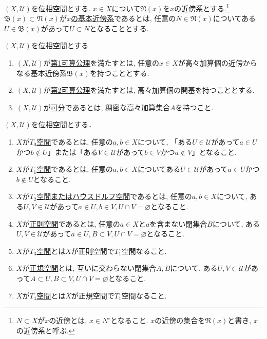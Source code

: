 \documentclass[dvipdfmx,a4paper,11pt]{article}
\theoremstyle{definition}
\begin{document}
 $(X, \mathscr{U})$を位相空間とする. $x\in X$について$\mathfrak{N}(x) $を$x$の近傍系とする.\footnote{$N \subset X$が$x$の近傍とは, $x \in N^{\circ}$となること. $x$の近傍の集合を$\mathfrak{N}(x) $と書き, $x$の近傍系と呼ぶ.} 
$\mathfrak{B}(x) \subset \mathfrak{N}(x) $が\underline{$x$の基本近傍系}であるとは, 任意の$N \in \mathfrak{N}(x)$についてある$U \in \mathfrak{B}(x)$があって$U \subset N$となることとする.
    \begin{tcolorbox}[
    colback = white,
    colframe = green!35!black,
    fonttitle = \bfseries,
    breakable = true]
$(X, \mathscr{U})$を位相空間とする
\begin{enumerate}
\setlength{\parskip}{0cm} 
  \setlength{\itemsep}{4pt} 
\item $(X, \mathscr{U})$が\underline{第1可算公理}を満たすとは, 任意の$x \in X$が高々加算個の近傍からなる基本近傍系$\mathfrak{B}(x)$を持つこととする.
\item $(X, \mathscr{U})$が\underline{第2可算公理}を満たすとは, 高々加算個の開基を持つこととする.
\item $(X, \mathscr{U})$が\underline{可分}であるとは, 稠密な高々加算集合$A$を持つこと.
\end{enumerate}
 \end{tcolorbox}

   \begin{tcolorbox}[
    colback = white,
    colframe = green!35!black,
    fonttitle = \bfseries,
    breakable = true]
$(X, \mathscr{U})$を位相空間とする．

\begin{enumerate}
\setlength{\parskip}{0cm} 
  \setlength{\itemsep}{4pt} 
  \item  $X$が\underline{$T_0$空間}であるとは, 任意の$a, b \in X$について, 「ある$U \in \mathscr{U}$があって$a \in U$かつ$b \not \in U$」または「ある$V \in \mathscr{U}$があって$b \in V$かつ$a\not \in V$」となること.
\item $X$が\underline{$T_1$空間}であるとは, 任意の$a, b \in X$についてある$U \in \mathscr{U}$があって$a \in U$かつ$b \not \in U$となること.
\item $X$が\underline{$T_2$空間またはハウスドルフ空間}であるとは, 任意の$a, b \in X$について, ある$U, V \in \mathscr{U}$があって$a \in U, b \in V, U \cap V = \varnothing $となること.
\item $X$が\underline{正則空間}であるとは, 任意の$a\in X$と$a$を含まない閉集合$B$について, ある$U, V \in \mathscr{U}$があって$a \in U, B \subset V, U \cap V = \varnothing $となること.
\item $X$が\underline{$T_3$空間}とは$X$が正則空間で$T_1$空間なること.
\item $X$が\underline{正規空間}とは, 互いに交わらない閉集合$A,B$について, ある$U, V \in \mathscr{U}$があって$A \subset U, B \subset V, U \cap V = \varnothing $となること.
\item $X$が\underline{$T_4$空間}とは$X$が正規空間で$T_1$空間なること.
\end{enumerate}
 \end{tcolorbox}
 
\end{document}
